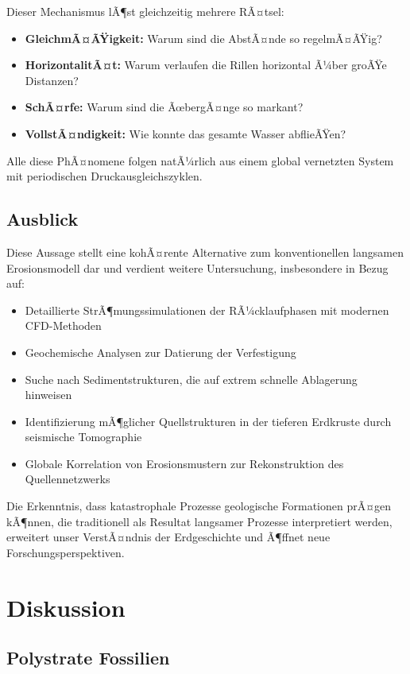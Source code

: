 ﻿\documentclass[12pt,a4paper]{report}
\begin{document}
Dieser Mechanismus lÃ¶st gleichzeitig mehrere RÃ¤tsel:
\begin{itemize}
	\item \textbf{GleichmÃ¤ÃŸigkeit:} Warum sind die AbstÃ¤nde so regelmÃ¤ÃŸig?
	\item \textbf{HorizontalitÃ¤t:} Warum verlaufen die Rillen horizontal Ã¼ber groÃŸe Distanzen?
	\item \textbf{SchÃ¤rfe:} Warum sind die ÃœbergÃ¤nge so markant?
	\item \textbf{VollstÃ¤ndigkeit:} Wie konnte das gesamte Wasser abflieÃŸen?
\end{itemize}

Alle diese PhÃ¤nomene folgen natÃ¼rlich aus einem global vernetzten System mit periodischen Druckausgleichszyklen.

\section{Ausblick}

Diese Aussage stellt eine kohÃ¤rente Alternative zum konventionellen langsamen Erosionsmodell dar und verdient weitere Untersuchung, insbesondere in Bezug auf:

\begin{itemize}
	\item Detaillierte StrÃ¶mungssimulationen der RÃ¼cklaufphasen mit modernen CFD-Metho\-den
	\item Geochemische Analysen zur Datierung der Verfestigung
	\item Suche nach Sedimentstrukturen, die auf extrem schnelle Ablagerung hinweisen
	\item Identifizierung mÃ¶glicher Quellstrukturen in der tieferen Erdkruste durch seismische Tomographie
	\item Globale Korrelation von Erosionsmustern zur Rekonstruktion des Quellennetzwerks
\end{itemize}

Die Erkenntnis, dass katastrophale Prozesse geologische Formationen prÃ¤gen kÃ¶nnen, die traditionell als Resultat langsamer Prozesse interpretiert werden, erweitert unser VerstÃ¤ndnis der Erdgeschichte und Ã¶ffnet neue Forschungsperspektiven.

\chapter{Diskussion}

\section{Polystrate Fossilien}
\end{document}
